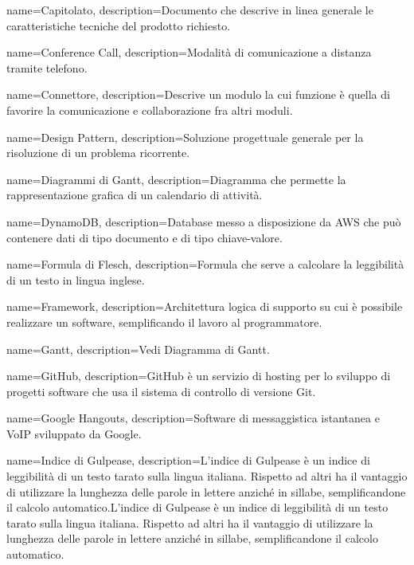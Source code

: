 {
name={Capitolato},
description={Documento che descrive in linea generale le caratteristiche tecniche del prodotto richiesto.}
}

{
name={Conference Call},
description={Modalità di comunicazione a distanza tramite telefono.}
}

{
name={Connettore},
description={Descrive un modulo la cui funzione è quella di favorire la comunicazione e collaborazione fra altri moduli.}
}

{
name={Design Pattern},
description={Soluzione progettuale generale per la risoluzione di un problema ricorrente.}
}

{
name={Diagrammi di Gantt},
description={Diagramma che permette la rappresentazione grafica di un calendario di attività.}
}

{
name={DynamoDB},
description={Database messo a disposizione da AWS che può contenere dati di tipo documento e di tipo chiave-valore.}
}

{
name={Formula di Flesch},
description={Formula che serve a calcolare la leggibilità di un testo in lingua inglese.}
}

{
name={Framework},
description={Architettura logica di supporto su cui è possibile realizzare un software, semplificando il lavoro al programmatore.}
}

{
name={Gantt},
description={Vedi Diagramma di Gantt.}
}

{
name={GitHub},
description={GitHub è un servizio di hosting per lo sviluppo di progetti software che usa il sistema di controllo di versione Git.}
}

{
name={Google Hangouts},
description={Software di messaggistica istantanea e VoIP sviluppato da Google.}
}

{
name={Indice di Gulpease},
description={L’indice di Gulpease è un indice di leggibilità di un testo tarato sulla lingua italiana. Rispetto ad altri ha il vantaggio di utilizzare la lunghezza delle
parole in lettere anziché in sillabe, semplificandone il calcolo automatico.L’indice di Gulpease è un indice di leggibilità di un testo tarato sulla lingua
italiana. Rispetto ad altri ha il vantaggio di utilizzare la lunghezza delle parole in lettere anziché in sillabe, semplificandone il calcolo automatico.}
}

